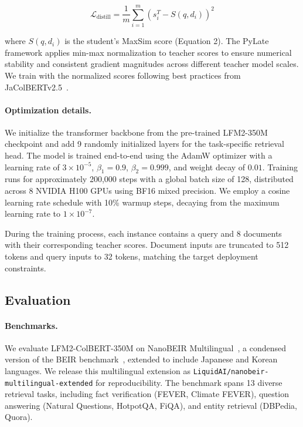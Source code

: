 \documentclass{article}
\begin{document}
\begin{equation}
\mathcal{L}_{\text{distill}} = \frac{1}{m} \sum_{i=1}^m \left(s_i^T - S(q, d_i)\right)^2
\end{equation}

where $S(q, d_i)$ is the student's MaxSim score (Equation 2). The PyLate framework applies min-max normalization to teacher scores to ensure numerical stability and consistent gradient magnitudes across different teacher model scales. We train with the normalized scores following best practices from JaColBERTv2.5~\citep{clavie2024jacolbert}.

\paragraph{Optimization details.}
We initialize the transformer backbone from the pre-trained LFM2-350M checkpoint and add 9 randomly initialized layers for the task-specific retrieval head. The model is trained end-to-end using the AdamW optimizer with a learning rate of $3 \times 10^{-5}$, $\beta_1 = 0.9$, $\beta_2 = 0.999$, and weight decay of $0.01$. Training runs for approximately 200,000 steps with a global batch size of 128, distributed across 8 NVIDIA H100 GPUs using BF16 mixed precision. We employ a cosine learning rate schedule with 10\% warmup steps, decaying from the maximum learning rate to $1 \times 10^{-7}$.

During the training process, each instance contains a query and 8 documents with their corresponding teacher scores. Document inputs are truncated to 512 tokens and query inputs to 32 tokens, matching the target deployment constraints.

\subsection{Evaluation}

\paragraph{Benchmarks.}
We evaluate LFM2-ColBERT-350M on NanoBEIR Multilingual~\citep{nanobeir-multilingual}, a condensed version of the BEIR benchmark~\citep{thakur2021beir}, extended to include Japanese and Korean languages. We release this multilingual extension as \texttt{LiquidAI/nanobeir-multilingual-extended} for reproducibility. The benchmark spans 13 diverse retrieval tasks, including fact verification (FEVER, Climate FEVER), question answering (Natural Questions, HotpotQA, FiQA), and entity retrieval (DBPedia, Quora).
\end{document}
